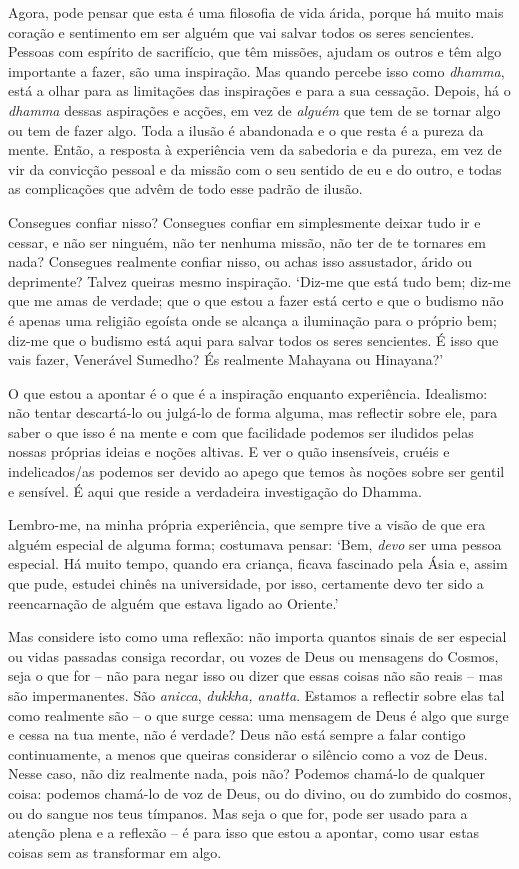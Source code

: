 Agora, pode pensar que esta é uma filosofia de vida árida, porque há muito mais
coração e sentimento em ser alguém que vai salvar todos os seres sencientes.
Pessoas com espírito de sacrifício, que têm missões, ajudam os outros e têm algo
importante a fazer, são uma inspiração. Mas quando percebe isso como
\emph{dhamma}, está a olhar para as limitações das inspirações e para a sua
cessação. Depois, há o \emph{dhamma} dessas aspirações e acções, em vez de
\emph{alguém} que tem de se tornar algo ou tem de fazer algo. Toda a ilusão é
abandonada e o que resta é a pureza da mente. Então, a resposta à experiência
vem da sabedoria e da pureza, em vez de vir da convicção pessoal e da missão com
o seu sentido de eu e do outro, e todas as complicações que advêm de todo esse
padrão de ilusão.

Consegues confiar nisso? Consegues confiar em simplesmente deixar tudo ir e
cessar, e não ser ninguém, não ter nenhuma missão, não ter de te tornares em
nada? Consegues realmente confiar nisso, ou achas isso assustador, árido ou
deprimente? Talvez queiras mesmo inspiração. `Diz-me que está tudo bem; diz-me
que me amas de verdade; que o que estou a fazer está certo e que o budismo não é
apenas uma religião egoísta onde se alcança a iluminação para o próprio bem;
diz-me que o budismo está aqui para salvar todos os seres sencientes. É isso
que vais fazer, Venerável Sumedho? És realmente Mahayana ou Hinayana?'

O que estou a apontar é o que é a inspiração enquanto experiência. Idealismo:
não tentar descartá-lo ou julgá-lo de forma alguma, mas reflectir sobre ele,
para saber o que isso é na mente e com que facilidade podemos ser iludidos pelas
nossas próprias ideias e noções altivas. E ver o quão insensíveis, cruéis e
indelicados/as podemos ser devido ao apego que temos às noções sobre ser gentil
e sensível. É aqui que reside a verdadeira investigação do Dhamma.

Lembro-me, na minha própria experiência, que sempre tive a visão de que era
alguém especial de alguma forma; costumava pensar: `Bem, \emph{devo} ser uma
pessoa especial. Há muito tempo, quando era criança, ficava fascinado pela Ásia
e, assim que pude, estudei chinês na universidade, por isso, certamente devo ter
sido a reencarnação de alguém que estava ligado ao Oriente.'

Mas considere isto como uma reflexão: não importa quantos sinais de ser especial
ou vidas passadas consiga recordar, ou vozes de Deus ou mensagens do Cosmos,
seja o que for -- não para negar isso ou dizer que essas coisas não são reais --
mas são impermanentes. São \emph{anicca}, \emph{dukkha, anatta}. Estamos a
reflectir sobre elas tal como realmente são -- o que surge cessa: uma mensagem
de Deus é algo que surge e cessa na tua mente, não é verdade? Deus não está
sempre a falar contigo continuamente, a menos que queiras considerar o silêncio
como a voz de Deus. Nesse caso, não diz realmente nada, pois não? Podemos
chamá-lo de qualquer coisa: podemos chamá-lo de voz de Deus, ou do divino, ou
do zumbido do cosmos, ou do sangue nos teus tímpanos. Mas seja o que for, pode
ser usado para a atenção plena e a reflexão -- é para isso que estou a apontar,
como usar estas coisas sem as transformar em algo.

